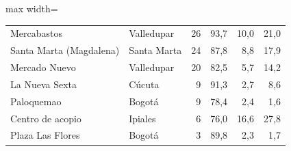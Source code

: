 \begin{table}[htbp]
\begin{adjustbox}{max width=\textwidth}
\begin{tabular}{llrrrr}
Mercabastos & Valledupar & 26 & 93{,}7 & 10{,}0 & 21{,}0 \\
Santa Marta (Magdalena) & Santa Marta & 24 & 87{,}8 & 8{,}8 & 17{,}9 \\
Mercado Nuevo & Valledupar & 20 & 82{,}5 & 5{,}7 & 14{,}2 \\
La Nueva Sexta & Cúcuta & 9 & 91{,}3 & 2{,}7 & 8{,}6 \\
Paloquemao & Bogotá & 9 & 78{,}4 & 2{,}4 & 1{,}6 \\
Centro de acopio & Ipiales & 6 & 76{,}0 & 16{,}6 & 27{,}8 \\
Plaza Las Flores & Bogotá & 3 & 89{,}8 & 2{,}3 & 1{,}7 \\
\bottomrule\end{tabular}\end{adjustbox}\end{table}
